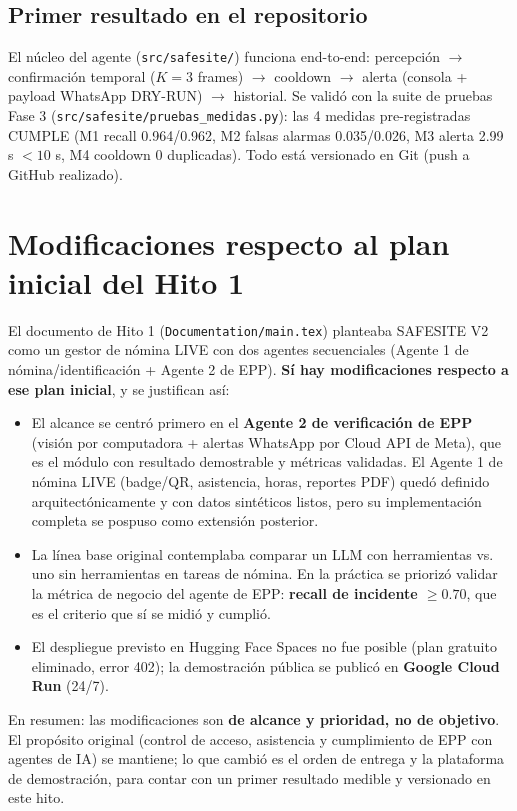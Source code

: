 \documentclass[10pt,letterpaper]{article}
\begin{document}
\subsection{Primer resultado en el repositorio}
El núcleo del agente (\texttt{src/safesite/}) funciona end-to-end: percepción $\rightarrow$ confirmación temporal ($K=3$ frames) $\rightarrow$ cooldown $\rightarrow$ alerta (consola + payload WhatsApp DRY-RUN) $\rightarrow$ historial. Se validó con la suite de pruebas Fase 3 (\texttt{src/safesite/pruebas\_medidas.py}): las 4 medidas pre-registradas CUMPLE (M1 recall 0.964/0.962, M2 falsas alarmas 0.035/0.026, M3 alerta 2.99 s $<10$ s, M4 cooldown 0 duplicadas). Todo está versionado en Git (push a GitHub realizado).

\section{Modificaciones respecto al plan inicial del Hito 1}

El documento de Hito 1 (\texttt{Documentation/main.tex}) planteaba SAFESITE V2 como un gestor de nómina LIVE con dos agentes secuenciales (Agente 1 de nómina/identificación + Agente 2 de EPP). \textbf{Sí hay modificaciones respecto a ese plan inicial}, y se justifican así:

\begin{itemize}
\item El alcance se centró primero en el \textbf{Agente 2 de verificación de EPP} (visión por computadora + alertas WhatsApp por Cloud API de Meta), que es el módulo con resultado demostrable y métricas validadas. El Agente 1 de nómina LIVE (badge/QR, asistencia, horas, reportes PDF) quedó definido arquitectónicamente y con datos sintéticos listos, pero su implementación completa se pospuso como extensión posterior.
\item La línea base original contemplaba comparar un LLM con herramientas vs. uno sin herramientas en tareas de nómina. En la práctica se priorizó validar la métrica de negocio del agente de EPP: \textbf{recall de incidente $\geq 0.70$}, que es el criterio que sí se midió y cumplió.
\item El despliegue previsto en Hugging Face Spaces no fue posible (plan gratuito eliminado, error 402); la demostración pública se publicó en \textbf{Google Cloud Run} (24/7).
\end{itemize}

En resumen: las modificaciones son \textbf{de alcance y prioridad, no de objetivo}. El propósito original (control de acceso, asistencia y cumplimiento de EPP con agentes de IA) se mantiene; lo que cambió es el orden de entrega y la plataforma de demostración, para contar con un primer resultado medible y versionado en este hito.
\end{document}
